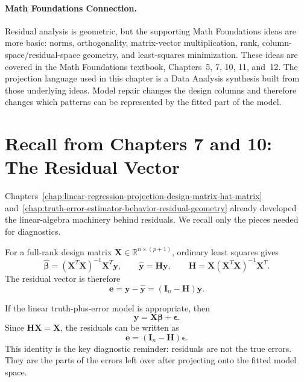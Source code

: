 \paragraph{Math Foundations Connection.}
Residual analysis is geometric, but the supporting Math Foundations ideas are more basic: norms, orthogonality, matrix-vector multiplication, rank, column-space/residual-space geometry, and least-squares minimization.  These ideas are covered in the Math Foundations textbook, Chapters~5, 7, 10, 11, and~12.  The projection language used in this chapter is a Data Analysis synthesis built from those underlying ideas.  Model repair changes the design columns and therefore changes which patterns can be represented by the fitted part of the model.

\section{Recall from Chapters 7 and 10: The Residual Vector}

Chapters~\ref{chap:linear-regression-projection-design-matrix-hat-matrix} and~\ref{chap:truth-error-estimator-behavior-residual-geometry} already developed the linear-algebra machinery behind residuals.  We recall only the pieces needed for diagnostics.

For a full-rank design matrix \(\mathbf{X}\in\mathbb{R}^{n\times(p+1)}\), ordinary least squares gives
\begin{equation}
  \widehat{\boldsymbol{\beta}}
  = (\mathbf{X}^T\mathbf{X})^{-1}\mathbf{X}^T\mathbf{y},
  \qquad
  \widehat{\mathbf{y}}=\mathbf{H}\mathbf{y},
  \qquad
  \mathbf{H}=\mathbf{X}(\mathbf{X}^T\mathbf{X})^{-1}\mathbf{X}^T.
\end{equation}
The residual vector is therefore
\begin{equation}
  \boxed{\mathbf{e}=\mathbf{y}-\widehat{\mathbf{y}}=(\mathbf{I}_n-\mathbf{H})\mathbf{y}.}
\end{equation}

If the linear truth-plus-error model is appropriate, then
\begin{equation}
  \mathbf{y}=\mathbf{X}\boldsymbol{\beta}+\boldsymbol{\epsilon}.
\end{equation}
Since \(\mathbf{H}\mathbf{X}=\mathbf{X}\), the residuals can be written as
\begin{equation}
  \boxed{\mathbf{e}=(\mathbf{I}_n-\mathbf{H})\boldsymbol{\epsilon}.}
\end{equation}
This identity is the key diagnostic reminder: residuals are not the true errors.  They are the parts of the errors left over after projecting onto the fitted model space.

